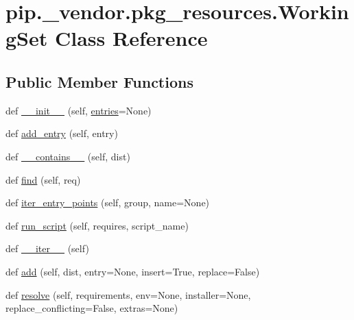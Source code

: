 \hypertarget{classpip_1_1__vendor_1_1pkg__resources_1_1WorkingSet}{}\section{pip.\+\_\+vendor.\+pkg\+\_\+resources.\+Working\+Set Class Reference}
\label{classpip_1_1__vendor_1_1pkg__resources_1_1WorkingSet}
\subsection*{Public Member Functions}
\begin{DoxyCompactItemize}
\item 
def \hyperlink{classpip_1_1__vendor_1_1pkg__resources_1_1WorkingSet_aee67aa919c47a87f7c44fa8c53513388}{\+\_\+\+\_\+init\+\_\+\+\_\+} (self, \hyperlink{classpip_1_1__vendor_1_1pkg__resources_1_1WorkingSet_adf875e5065f4e84a53bb40c44a05fd9b}{entries}=None)
\item 
def \hyperlink{classpip_1_1__vendor_1_1pkg__resources_1_1WorkingSet_a10dbfcb72bfdc7c7b16d764c7002a87d}{add\+\_\+entry} (self, entry)
\item 
def \hyperlink{classpip_1_1__vendor_1_1pkg__resources_1_1WorkingSet_a90527276e04a3229adef53fafdd40402}{\+\_\+\+\_\+contains\+\_\+\+\_\+} (self, dist)
\item 
def \hyperlink{classpip_1_1__vendor_1_1pkg__resources_1_1WorkingSet_a08fa1c61ff31ce49ee1a58cfc02fd315}{find} (self, req)
\item 
def \hyperlink{classpip_1_1__vendor_1_1pkg__resources_1_1WorkingSet_a27ffb04e9ea00f4300200e68f68f8d86}{iter\+\_\+entry\+\_\+points} (self, group, name=None)
\item 
def \hyperlink{classpip_1_1__vendor_1_1pkg__resources_1_1WorkingSet_a64f8503c4eb0c05db9faf1bc62c1a21f}{run\+\_\+script} (self, requires, script\+\_\+name)
\item 
def \hyperlink{classpip_1_1__vendor_1_1pkg__resources_1_1WorkingSet_a947f4a415da2a5e3c79796d252f3c71c}{\+\_\+\+\_\+iter\+\_\+\+\_\+} (self)
\item 
def \hyperlink{classpip_1_1__vendor_1_1pkg__resources_1_1WorkingSet_a721315d2a4a0a3ead71bf8d1b83261ce}{add} (self, dist, entry=None, insert=True, replace=False)
\item 
def \hyperlink{classpip_1_1__vendor_1_1pkg__resources_1_1WorkingSet_a3ec2a2ca189616895b93a5a7820d0e94}{resolve} (self, requirements, env=None, installer=None, replace\+\_\+conflicting=False, extras=None)

\end{DoxyCompactItemize}
